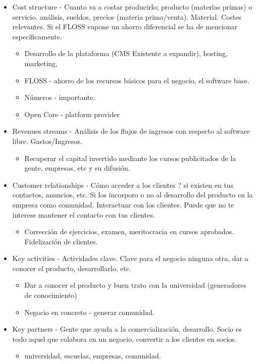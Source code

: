 \documentclass[11pt]{scrartcl}
\begin{document}
\begin{itemize}
    \item Cost structure - Cuanto va a costar producirlo; producto
    (materias primas) o servicio. análisis, sueldos, precios
    (materia prima/venta). Material. Costes relevantes. Si el FLOSS supone un
    ahorro diferencial se ha de mencionar específicamente.
    \begin{itemize}
        \item Desarrollo de la plataforma (CMS Existente a expandir), hosting, marketing,
        \item FLOSS - ahorro de los recursos básicos para el negocio, el software base.
        \item Números - importante.
        \item Open Core - platform provider
    \end{itemize}
    
    \item Revenues streams - Análisis de los flujos de ingresos con respecto al
    software libre. Gastos/Ingresos.
    \begin{itemize}
        \item Recuperar el capital invertido mediante los cursos publicitados de la gente, empresas, etc y su difusión.
    \end{itemize}
    
    
    \item Customer relationships - Cómo acceder a los clientes ? si existen en
    tus contactos, anuncios, etc. Si los incorporo o no al desarrollo del producto
    en la empresa como comunidad. Interactuar con los clientes. Puede que no te
    interese mantener el contacto con tus clientes.
    
    \begin{itemize}
        \item Corrección de ejercicios, examen, meritocracia en cursos aprobados. Fidelización de clientes.
    \end{itemize}
    
    
    \item Key activities - Actividades clave. Clave para el negocio ninguna otra,
    dar a conocer el producto, desarrollarlo, etc.
    \begin{itemize}
        \item Dar a conocer el producto y buen trato con la universidad (generadores de conocimiento)
        \item Negocio en concreto - generar comunidad.
    \end{itemize}
    
    
    \item Key partners - Gente que ayuda a la comercialización, desarrollo.
    Socio es todo aquel que colabora en un negocio, convertir a los clientes en socios.
    \begin{itemize}
        \item universidad, escuelas, empresas, comunidad.
    \end{itemize}
    
    
\end{itemize}
\end{document}
